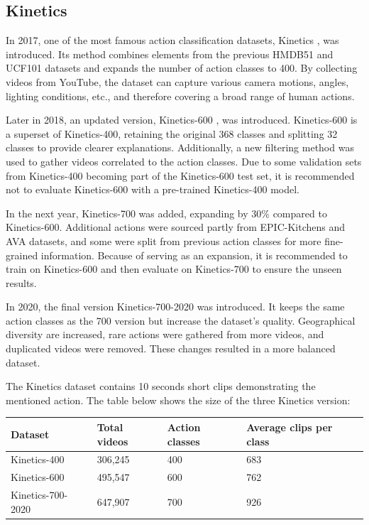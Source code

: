 \documentclass[a4paper]{article}
\begin{document}
\subsection{Kinetics}
In 2017, one of the most famous action classification datasets, Kinetics \cite{Kinetics-400}, was introduced. Its method combines elements from the previous HMDB51 \cite{HMDB51} and UCF101 \cite{UCF101}datasets and expands the number of action classes to 400. By collecting videos from YouTube, the dataset can capture various camera motions, angles, lighting conditions, etc., and therefore covering a broad range of human actions.

Later in 2018, an updated version, Kinetics-600 \cite{Kinetics-600}, was introduced. Kinetics-600 is a superset of Kinetics-400, retaining the original 368 classes and splitting 32 classes to provide clearer explanations. Additionally, a new filtering method was used to gather videos correlated to the action classes. Due to some validation sets from Kinetics-400 becoming part of the Kinetics-600 test set, it is recommended not to evaluate Kinetics-600 with a pre-trained Kinetics-400 model.

In the next year, Kinetics-700 \cite{Kinetics-700} was added, expanding by 30\% compared to Kinetics-600. Additional actions were sourced partly from EPIC-Kitchens and AVA datasets, and some were split from previous action classes for more fine-grained information. Because of serving as an expansion, it is recommended to train on Kinetics-600 and then evaluate on Kinetics-700 to ensure the unseen results.

In 2020, the final version Kinetics-700-2020 \cite{Kinetics-700-2020} was introduced. It keeps the same action classes as the 700 version but increase the dataset's quality. Geographical diversity are increased, rare actions were gathered from more videos, and duplicated videos were removed. These changes resulted in a more balanced dataset.

The Kinetics dataset contains 10 seconds short clips demonstrating the mentioned action. The table below shows the size of the three Kinetics version:
\begin{center}
	\begin{tabular}{| l | l | l | l |}
		\hline
		Dataset & Total videos & Action classes & Average clips per class \\ \hline
		Kinetics-400 & 306,245 & 400 & 683\\ \hline
		Kinetics-600 & 495,547 & 600 & 762\\ \hline
		Kinetics-700-2020 & 647,907 & 700 &  926\\ \hline
	\end{tabular}
\end{center}
\end{document}

